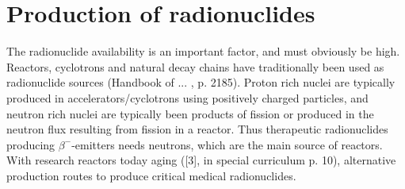 \documentclass[a4paper,11pt,twoside]{book}
\begin{document}
\section{Production of radionuclides}

The radionuclide availability is an important factor, and must obviously be high. Reactors, cyclotrons and natural decay chains have traditionally been used as radionuclide sources (Handbook of ... , p. 2185). Proton rich nuclei are typically produced in accelerators/cyclotrons using positively charged particles, and neutron rich nuclei are typically been products of fission or produced in the neutron flux resulting from fission in a reactor. Thus therapeutic radionuclides producing $\beta^-$-emitters needs neutrons, which are the main source of reactors. With research reactors today aging ([3], in special curriculum p. 10), alternative production routes to produce critical medical radionuclides. \\
\end{document}
